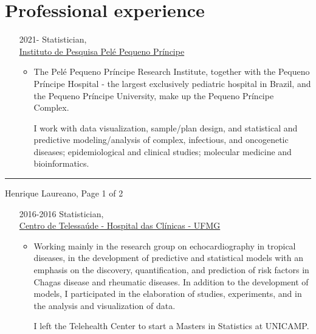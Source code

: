 \documentclass[12pt]{article}
\newcommand{\horrule}[1]{\noindent\rule{\linewidth}{#1}}
\begin{document}
\vspace{-0.5cm}
\section*{Professional experience}

\begin{itemize}
 \item[2021-] Statistician,\\
              \href{http://www.pelepequenoprincipe.org.br/}{\color{blue}
                Instituto de Pesquisa Pel\'{e} Pequeno Pr\'{i}ncipe}
  \begin{itemize}
  \item The Pelé Pequeno Príncipe Research Institute, together with the
        Pequeno Príncipe Hospital - the largest exclusively pediatric
        hospital in Brazil, and the Pequeno Príncipe University, make up
        the Pequeno Príncipe Complex.

        I work with data visualization, sample/plan design, and
        statistical and predictive modeling/analysis of complex,
        infectious, and oncogenetic diseases; epidemiological and
        clinical studies; molecular medicine and bioinformatics.
  \end{itemize}
\end{itemize}

\vspace{\fill}
\horrule{1pt}
\noindent Henrique Laureano, \hfill Page 1 of 2

\begin{itemize}
 \item[2016-2016] Statistician,\\
                  \href{https://telessaude.hc.ufmg.br/}{\color{blue}
                    Centro de Telessa\'{u}de -
                    Hospital das Cl\'{i}nicas - UFMG}
  \begin{itemize}
   \item Working mainly in the research group on echocardiography in
         tropical diseases, in the development of predictive and
         statistical models with an emphasis on the discovery,
         quantification, and prediction of risk factors in Chagas
         disease and rheumatic diseases. In addition to the development
         of models, I participated in the elaboration of studies,
         experiments, and in the analysis and visualization of data.

         I left the Telehealth Center to start a Masters in Statistics
         at UNICAMP.
  \end{itemize}
\end{itemize}
\end{document}
